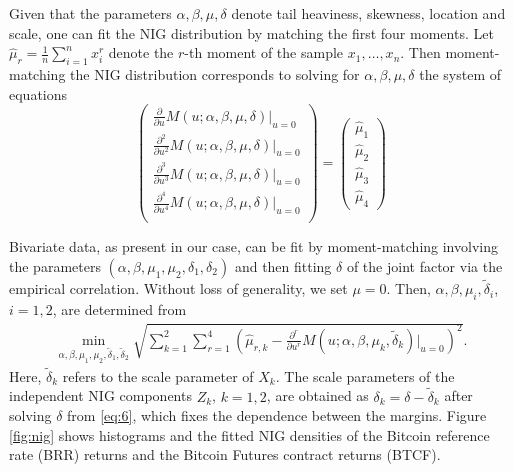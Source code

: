 Given that the parameters $\alpha, \beta, \mu, \delta$ denote tail
heaviness, skewness, location and scale, one can fit the NIG
distribution by matching the first four moments. Let
$\hat\mu_r=\frac{1}{n} \sum_{i=1}^n x_i^r$ denote the $r$-th moment of
the sample $x_1, \ldots, x_n$. Then moment-matching the NIG
distribution corresponds to solving for $\alpha, \beta, \mu, \delta$
the system of equations
\begin{equation*}
  \begin{pmatrix}
    \frac{\partial}{\partial u} M(u; \alpha, \beta, \mu,
    \delta)|_{u=0}\\[5pt]
    \frac{\partial^2}{\partial u^2} M(u; \alpha, \beta, \mu,
    \delta)|_{u=0}\\[5pt]
    \frac{\partial^3}{\partial u^3} M(u; \alpha, \beta, \mu,
    \delta)|_{u=0}\\[5pt]
    \frac{\partial^4}{\partial u^4} M(u; \alpha, \beta, \mu,
    \delta)|_{u=0}\\
  \end{pmatrix}
  =
  \begin{pmatrix}
    \hat\mu_1\\[5pt]
    \hat\mu_2\\[5pt]
    \hat\mu_3\\[5pt]
    \hat\mu_4
  \end{pmatrix}
\end{equation*}


Bivariate data, as present in our case, can be
fit by moment-matching involving the parameters $(\alpha, \beta,
\mu_1, \mu_2, \delta_1, \delta_2)$ and then fitting $\delta$ of the
joint factor via the empirical correlation. Without loss of
generality, we set $\mu=0$. Then, $\alpha, \beta,
\mu_i,\tilde\delta_i$, $i=1,2$, are determined from 
\begin{align*}
  \min_{\alpha, \beta, \mu_1, \mu_2, \tilde\delta_1, \tilde\delta_2}
  \sqrt{\sum_{k=1}^2 \sum_{r=1}^4
  \left(\hat\mu_{r,k}-\frac{\partial^r}{\partial u^r} M(u; \alpha, \beta,
  \mu_k, \tilde\delta_k)\Big|_{u=0}\right)^2}.
\end{align*}
Here, $\tilde\delta_k$ refers to the scale parameter of
$X_k$. The scale parameters of the independent NIG components $Z_k$,
$k=1,2$, are obtained as $\delta_k=\delta-\tilde \delta_k$ after
solving $\delta$ from \eqref{eq:6}, which fixes the dependence between
the margins. Figure \ref{fig:nig} shows
histograms and the fitted NIG densities of the Bitcoin reference rate
(BRR) returns and the Bitcoin Futures contract returns (BTCF). 


